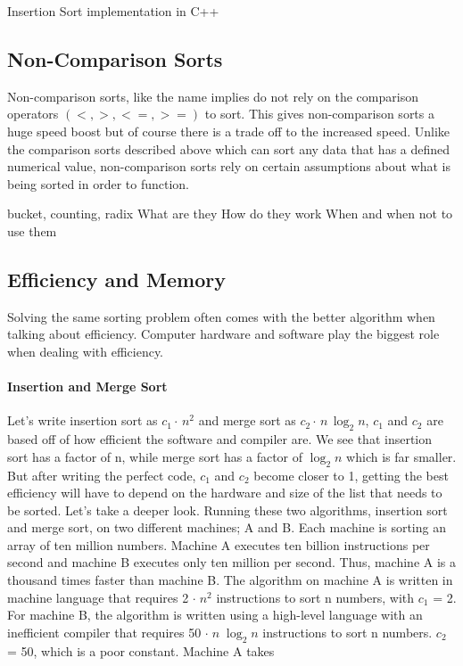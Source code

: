 \documentclass[12pt]{article}
\begin{document}
	
	
	
	\begin{Snippet}[h]
		
		\caption[Insertion Sort]{Insertion Sort implementation in C++}	
	\end{Snippet}
	
	
	
	\subsection{Non-Comparison Sorts}
	
	Non-comparison sorts, like the name implies do not rely on the comparison operators $(<,>,<=,>=)$ to sort.
	This gives non-comparison sorts a huge speed boost but of course there is a trade off to the increased speed. 
	Unlike the comparison sorts described above which can sort any data that has a defined numerical value, non-comparison sorts rely on certain assumptions about what is being sorted in order to function.
	
	bucket, counting, radix
	What are they
	How do they work
	When and when not to use them
	
	
	\subsection{Efficiency and Memory}
	
	Solving the same sorting problem often comes with the better algorithm when talking about efficiency.
	Computer hardware and software play the biggest role when dealing with efficiency.
	
	\paragraph{Insertion and Merge Sort}
	
	Let’s write insertion sort as $c_1 \cdot\,n^2$ and merge sort as $c_2 \cdot\,n\,\log_2{n}$, $c_1$ and $c_2$ are based off of how efficient the software and compiler are.
	We see that insertion sort has a factor of n, while merge sort has a factor of $\log_2{n}$ which is far smaller.
	But after writing the perfect code, $c_1$ and $c_2$ become closer to 1, getting the best efficiency will have to depend on the hardware and size of the list that needs to be sorted.
	Let’s take a deeper look. Running these two algorithms, insertion sort and merge sort, on two different machines; A and B. Each machine is sorting an array of ten million numbers.
	Machine A executes ten billion instructions per second and machine B executes only ten million per second.
	Thus, machine A is a thousand times faster than machine B.
	The algorithm on machine A is written in machine language that requires 2 $\cdot\;n^2$ instructions to sort n numbers, with $c_1$ = 2.
	For machine B, the algorithm is written using a high-level language with an inefficient compiler that requires 50 $\cdot\;n\;\log_2{n}$ instructions to sort n numbers. $c_2$ = 50, which is a poor constant.
	Machine A takes
	
\end{document}
